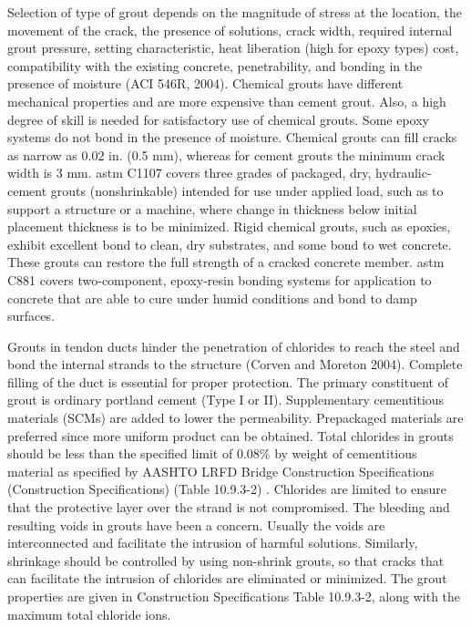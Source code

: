 Selection of type of grout depends on the magnitude of stress at the location, the movement of the crack, the
presence of solutions, crack width, required internal grout pressure, setting characteristic, heat liberation (high for
epoxy types) cost, compatibility with the existing concrete, penetrability, and bonding in the presence of moisture
(ACI 546R, 2004). Chemical grouts have different mechanical properties and are more expensive than cement grout.
Also, a high degree of skill is needed for satisfactory use of chemical grouts. Some epoxy systems do not bond in the
presence of moisture. Chemical grouts can fill cracks as narrow as 0.02 in. (0.5 mm), whereas for cement grouts the
minimum crack width is 3 mm. \acrshort*{astm} C1107 covers three grades of packaged, dry, hydraulic-cement grouts
(nonshrinkable) intended for use under applied load, such as to support a structure or a machine, where change in
thickness below initial placement thickness is to be minimized. Rigid chemical grouts, such as epoxies, exhibit
excellent bond to clean, dry substrates, and some bond to wet concrete. These grouts can restore the full strength of a
cracked concrete member. \acrshort*{astm} C881 covers two-component, epoxy-resin bonding systems for application to
concrete that are able to cure under humid conditions and bond to damp surfaces.

Grouts in tendon ducts hinder the penetration of chlorides to reach the steel and bond the internal strands to the
structure (Corven and Moreton 2004). Complete filling of the duct is essential for proper protection. The primary
constituent of grout is ordinary portland cement (Type I or II). Supplementary cementitious materials (SCMs) are
added to lower the permeability. Prepackaged materials are preferred since more uniform product can be obtained.
Total chlorides in grouts should be less than the specified limit of 0.08\% by weight of cementitious material as
specified by AASHTO LRFD Bridge Construction Specifications (Construction Specifications) (Table 10.9.3-2) \cite{aashto2010lc}. Chlorides are limited to ensure that the protective layer over the strand is not compromised. The
bleeding and resulting voids in grouts have been a concern. Usually the voids are interconnected and facilitate the intrusion of harmful solutions. Similarly, shrinkage should be controlled by using non-shrink grouts, so that cracks
that can facilitate the intrusion of chlorides are eliminated or minimized. The grout properties are given in
Construction Specifications Table 10.9.3-2, along with the maximum total chloride ions.

